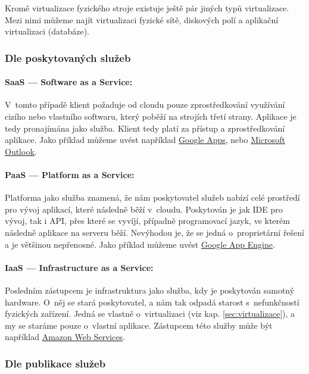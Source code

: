 Kromě virtualizace fyzického stroje existuje ještě pár jiných typů virtualizace. Mezi nimi můžeme najít virtualizaci fyzické sítě, diskových polí a aplikační virtualizaci (databáze).

\subsubsection{Dle poskytovaných služeb}

\paragraph{SaaS --- Software as a Service:}
\label{sec:saas}
V~tomto případě klient požaduje od cloudu pouze zprostředkování využívání cizího nebo vlastního softwaru, který poběží na strojích třetí strany. Aplikace je tedy pronajímána jako služba. Klient tedy platí za přístup a zprostředkování aplikace. Jako příklad můžeme uvést například \href{apps.google.com}{Google Apps}, nebo \href{http://domains.live.com}{Microsoft Outlook}.

\paragraph{PaaS --- Platform as a Service:}
\label{sec:paas}
Platforma jako služba znamená, že nám poskytovatel služeb nabízí celé prostředí pro vývoj aplikací, které následně běží v~cloudu. Poskytován je jak IDE pro vývoj, tak i API, přes které se vyvíjí, případně programovací jazyk, ve kterém následně aplikace na serveru běží. Nevýhodou je, že se jedná o~proprietární řešení a je většinou nepřenosné. Jako příklad můžeme uvést \href{appengine.google.com}{Google App Engine}.

\paragraph{IaaS --- Infrastructure as a Service:}
\label{sec:iaas}
Posledním zástupcem je infrastruktura jako služba, kdy je poskytován samotný hardware. O~něj se stará poskytovatel, a nám tak odpadá starost s~nefunkčností fyzických zařízení. Jedná se vlastně o~virtualizaci (viz kap. \ref{sec:virtualizace}), a my se staráme pouze o~vlastní aplikace. Zástupcem této služby může být například \href{http://aws.amazon.com/}{Amazon Web Services}.

\subsubsection{Dle publikace služeb}


